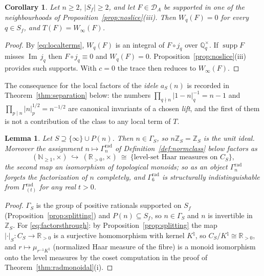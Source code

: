 \documentclass[11pt]{amsart}
\newtheorem{lemma}[theorem]{Lemma}
\newtheorem{corollary}[theorem]{Corollary}
\theoremstyle{definition}
\theoremstyle{remark}
\newcommand{\R}{\mathbb R}
\newcommand{\N}{\mathbb N}
\newcommand{\Z}{\mathbb Z}
\newcommand{\Q}{\mathbb Q}
\newcommand{\Iml}{\operatorname{Im}}
\newcommand{\supp}{\operatorname{supp}}
\newcommand{\Knat}{K^{\natural}}
\newcommand{\DA}{\mathcal D_A}
\begin{document}
\begin{corollary}\label{cor:liftnotcontact}
Let $n\ge2$, $|S_f|\ge2$, and let $F\in\DA$ be supported in one of the
neighbourhoods of Proposition~\ref{prop:noslice}(iii). Then $W_q(F)=0$ for
every $q\in S_f$, and $T(F)=W_\infty(F)$.
\end{corollary}

\begin{proof}
By \eqref{eq:localterms}, $W_q(F)$ is an integral of $F\circ j_q$ over
$\Q_q^\times$. If $\supp F$ misses $\Iml\,j_q$ then $F\circ j_q\equiv0$ and
$W_q(F)=0$. Proposition~\ref{prop:noslice}(iii) provides such supports. With
$c=0$ the trace then reduces to $W_\infty(F)$.
\end{proof}

The consequence for the local factors of the \emph{idele} $a_S(n)$ is recorded
in Theorem~\ref{thm:separation} below: the numbers $\prod_{q\nmid n}
|1-n|_q^{-1}=n-1$ and $\prod_{p\mid n}|n|_p^{1/2}=n^{-1/2}$ are canonical
invariants of a chosen \emph{lift}, and the first of them is not a contribution
of the class to any local term of $T$.

\begin{lemma}\label{lem:notideal}
Let $S\supseteq\{\infty\}\cup P(n)$. Then $n\in\Gamma_S$, so $n\Z_S=\Z_S$ is
the unit ideal. Moreover the assignment $n\mapsto\Gamma_n^{\mathrm{rad}}$ of
Definition~\ref{def:normclass} below factors as
\begin{equation}\label{eq:factorsthrough}
  (\N_{\ge1},\times)\ \hookrightarrow\ (\R_{>0},\times)\ \cong\
  \{\text{level-set Haar measures on }C_S\},
\end{equation}
the second map an isomorphism of topological monoids; so as an \emph{object}
$\Gamma_n^{\mathrm{rad}}$ forgets the factorization of $n$ completely, and
$\Gamma_6^{\mathrm{rad}}$ is structurally indistinguishable from
$\Gamma^{\mathrm{rad}}_{(t)}$ for any real $t>0$.
\end{lemma}

\begin{proof}
$\Gamma_S$ is the group of positive rationals supported on $S_f$
(Proposition~\ref{prop:splitting}) and $P(n)\subseteq S_f$, so $n\in\Gamma_S$
and $n$ is invertible in $\Z_S$. For \eqref{eq:factorsthrough}: by
Proposition~\ref{prop:splitting} the map $|\cdot|_S:C_S\to\R_{>0}$ is a
surjective homomorphism with kernel $\Knat$, so $C_S/\Knat\cong\R_{>0}$, and
$r\mapsto\mu_{r^{-1}\Knat}$ (normalized Haar measure of the fibre) is a monoid
isomorphism onto the level measures by the coset computation in the proof of
Theorem~\ref{thm:radmonoidal}(i).
\end{proof}
\end{document}
